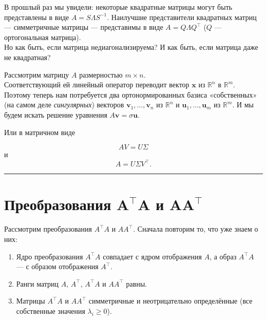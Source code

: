 \documentclass[11pt,a4paper]{article}
\providecommand{\tightlist}{%
      \setlength{\itemsep}{0pt}\setlength{\parskip}{0pt}}
\begin{document}
В прошлый раз мы увидели: некоторые квадратные матрицы могут быть
представлены в виде \(A = S \Lambda S^{-1}\). Наилучшие представители
квадратных матриц --- симметричные матрицы --- представимы в виде
\(A = Q \Lambda Q^\top\) (\(Q\) --- ортогональная матрица).\\
Но как быть, если матрица недиагонализируема?
И как быть, если матрица
даже не квадратная?

Рассмотрим матрицу \(A\) размерностью \(m \times n\).\\
Соответствующий ей линейный оператор переводит вектор \(\mathbf{x}\) из
\(\mathbb{R}^n\) в \(\mathbb{R}^m\). Поэтому теперь нам потребуется два
ортонормированных базиса «собственных» (на самом деле
\emph{сингулярных}) векторов \(\mathbf{v}_1, \ldots, \mathbf{v}_n\) из
\(\mathbb{R}^n\) и \(\mathbf{u}_1, \ldots, \mathbf{u}_m\) из
\(\mathbb{R}^m\). И мы будем искать решение уравнения
\(A\mathbf{v} = \sigma \mathbf{u}\).

Или в матричном виде

\[ A V = U \Sigma \] и \[ A = U \Sigma V^\top. \]

    \begin{center}\rule{0.5\linewidth}{0.5pt}\end{center}

    \hypertarget{ux43fux440ux435ux43eux431ux440ux430ux437ux43eux432ux430ux43dux438ux44f-mathbfatop-a-ux438-mathbfa-atop}{%
\section{\texorpdfstring{Преобразования \(\mathbf{A^\top A}\) и
\(\mathbf{A A^\top}\)}{Преобразования \textbackslash mathbf\{A\^{}\textbackslash top A\} и \textbackslash mathbf\{A A\^{}\textbackslash top\}}}\label{ux43fux440ux435ux43eux431ux440ux430ux437ux43eux432ux430ux43dux438ux44f-mathbfatop-a-ux438-mathbfa-atop}}

Рассмотрим преобразования \(A^\top A\) и \(A A^\top\). Сначала повторим
то, что уже знаем о них:

\begin{enumerate}
\def\labelenumi{\arabic{enumi}.}
\tightlist
\item
  Ядро преобразования \(A^\top A\) совпадает с ядром отображения \(A\),
  а образ \(A^\top A\) --- с образом отображения \(A^\top\).
\item
  Ранги матриц \(A\), \(A^\top\), \(A^\top A\) и \(AA^\top\) равны.
\item
  Матрицы \(A^\top A\) и \(A A^\top\) симметричные и неотрицательно
  определённые (все собственные значения \(\lambda_i \ge 0\)).
\end{enumerate}
\end{document}
